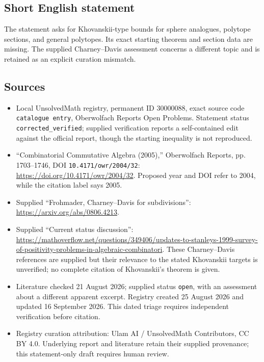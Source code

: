 \documentclass[11pt]{article}
\begin{document}
\subsection{Short English statement}
The statement asks for Khovanskii-type bounds for sphere analogues, polytope sections, and general polytopes. Its exact starting theorem and section data are missing. The supplied Charney--Davis assessment concerns a different topic and is retained as an explicit curation mismatch.
\subsection{Sources}
\begin{itemize}
\item Local UnsolvedMath registry, permanent ID \(30000088\), exact source code \texttt{catalogue entry}, Oberwolfach Reports Open Problems. Statement status \texttt{corrected\_verified}; supplied verification reports a self-contained edit against the official report, though the starting inequality is not reproduced.
\item ``Combinatorial Commutative Algebra (2005),'' Oberwolfach Reports, pp. 1703--1746, DOI \texttt{10.4171/owr/2004/32}: \url{https://doi.org/10.4171/owr/2004/32}. Proposed year and DOI refer to 2004, while the citation label says 2005.
\item Supplied ``Frohmader, Charney--Davis for subdivisions'': \url{https://arxiv.org/abs/0806.4213}.
\item Supplied ``Current status discussion'': \url{https://mathoverflow.net/questions/349406/updates-to-stanleys-1999-survey-of-positivity-problems-in-algebraic-combinatori}. These Charney--Davis references are supplied but their relevance to the stated Khovanskii targets is unverified; no complete citation of Khovanskii's theorem is given.
\item Literature checked 21 August 2026; supplied status \texttt{open}, with an assessment about a different apparent excerpt. Registry created 25 August 2026 and updated 16 September 2026. This dated triage requires independent verification before citation.
\item Registry curation attribution: Ulam AI / UnsolvedMath Contributors, CC BY 4.0. Underlying report and literature retain their supplied provenance; this statement-only draft requires human review.
\end{itemize}
\end{document}
